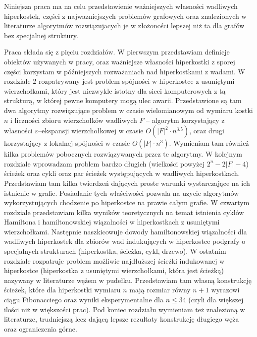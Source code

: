 \documentclass{pracamgr}
\begin{document}
  Niniejsza praca ma na celu przedstawienie ważniejszych własności wadliwych hiperkostek, części z najwazniejszych problemów grafowych
  oraz znalezionych w literaturze algorytmów rozwiązujacych je w złożoności lepszej niż ta dla grafów bez specjalnej struktury.
  
  Praca składa się z pięciu rozdziałów. W pierwszym przedstawiam definicje obiektów używanych w pracy, oraz ważniejsze własności
  hiperkostki z sporej części korzystam w późniejszych rozważaniach nad hiperkostkami z wadami.\newline
  W rozdziale 2 rozpatrywany jest problem spójności w hiperkostce z usuniętymi wierzchołkami, który jest niezwykle istotny dla sieci komputerowych
  z tą strukturą, w której pewne komputery mogą ulec awarii. Przedstawione są tam dwa algorytmy rozwiązujące problem w czasie wielomianowym od wymiaru kostki $n$
  i liczności zbioru wierzchołków wadliwych $F$ -- algorytm korzystający z własności $\varepsilon$--ekspansji wierzchołkowej w czasie $O(|F|^2\cdot n^{3.5})$,
  oraz drugi korzystający z lokalnej spójności w czasie $O(|F|\cdot n^3)$. Wymieniam tam również kilka problemów pobocznych rozwiązywanych przez te algorytmy.\newline
  W kolejnym rozdziale wprowadzam problem bardzo długich (wielkości powyżej $2^n-2|F|-4$) ścieżek oraz cykli oraz par ścieżek występujących w wadliwych hiperkostkach.
  Przedstawiam tam kilka twierdzeń dających proste warunki wystarczające na ich istnienie w grafie. 
  Posiadanie tych właściwości pozwala na uzycie algorytmów wykorzystujących chodzenie po hiperkostce na prawie całym grafie.\newline
  W czwartym rozdziale przedstawiam kilka wyników teoretycznych na temat istnienia cyklów Hamiltona i hamiltonowskiej wiązalności w hiperkostkach z usuniętymi
  wierzchołkami. Następnie naszkicowuje dowody hamiltonowskiej wiązalności dla wadliwych hiperkostek dla zbiorów wad indukujących w hiperkostce
  podgrafy o specjalnych strukturach (hiperkostka, ścieżka, cykl, drzewo).\newline
  W ostatnim rozdziale rozpatruje problem możliwie najdłuższej ścieżki indukowanej w hiperkostce (hiperkostka z usuniętymi wierzchołkami, która jest ścieżką)
  nazywany w literaturze wężem w pudełku. Przedstawiam tam własną konstrukcję ścieżek, które dla hiperkostki wymiaru $n$ mają rozmiar równy $n+1$
  wyrazowi ciągu Fibonacciego oraz wyniki eksperymentalne dla $n\le34$ (czyli dla większej ilości niż w większości prac).
  Pod koniec rozdziału wymieniam też znalezioną w literaturze, trudniejszą lecz dającą lepsze rezultaty konstrukcję długiego węża oraz 
  ograniczenia górne.
\end{document}
